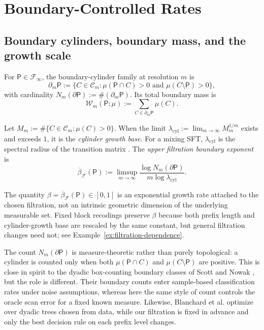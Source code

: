 \section{Boundary-Controlled Rates}
\label{sec:rates}

\subsection{Boundary cylinders, boundary mass, and the growth scale}

\begin{definition}
\label{def:boundary-cylinder}
For $\mathsf{P}\in\mathcal{F}_\infty$, the boundary-cylinder family at
resolution $m$ is
\[
\partial_m\mathsf{P}
:=\{C\in\mathcal{C}_m:\mu(\mathsf{P}\cap C)>0\text{ and }\mu(C\setminus\mathsf{P})>0\},
\]
with cardinality $N_m(\partial\mathsf{P}):=\#(\partial_m\mathsf{P})$.  Its
total boundary mass is
\[
\mathcal{W}_m(\mathsf{P};\mu):=\sum_{C\in\partial_m\mathsf{P}}\mu(C).
\]

Let $M_m:=\#\{C\in\mathcal{C}_m:\mu(C)>0\}$.  When the limit
$\lambda_{\mathrm{cyl}}:=\lim_{m\to\infty}M_m^{1/m}$ exists and exceeds $1$,
it is the \emph{cylinder growth base}.  For a mixing SFT,
$\lambda_{\mathrm{cyl}}$ is the spectral radius of the transition matrix
\cite{LindMarcus1995}.  The \emph{upper filtration boundary exponent} is
\[
\overline{\beta}_{\mathcal{F}}(\mathsf{P})
:=\limsup_{m\to\infty}
\frac{\log N_m(\partial\mathsf{P})}{m\log\lambda_{\mathrm{cyl}}}.
\]
\end{definition}

The quantity $\beta=\overline{\beta}_{\mathcal{F}}(\mathsf{P})\in[0,1]$ is an
exponential growth rate attached to the chosen filtration, not an intrinsic
geometric dimension of the underlying measurable set.  Fixed block recodings
preserve $\beta$ because both prefix length and cylinder-growth base are
rescaled by the same constant, but general filtration changes need not; see
Example~\ref{ex:filtration-dependence}.

The count $N_m(\partial\mathsf{P})$ is measure-theoretic rather than purely
topological: a cylinder is counted only when both $\mu(\mathsf{P}\cap C)$ and
$\mu(C\setminus\mathsf{P})$ are positive.  This is close in spirit to the
dyadic box-counting boundary classes of Scott and Nowak
\cite{ScottNowak2006}, but the role is different.  Their boundary counts enter
sample-based classification rates under noise assumptions, whereas here the
same style of count controls the oracle scan error for a fixed known measure.
Likewise, Blanchard et al. \cite{BlanchardSchaferRozenholcMuller2007} optimize
over dyadic trees chosen from data, while our filtration is fixed in advance
and only the best decision rule on each prefix level changes.

